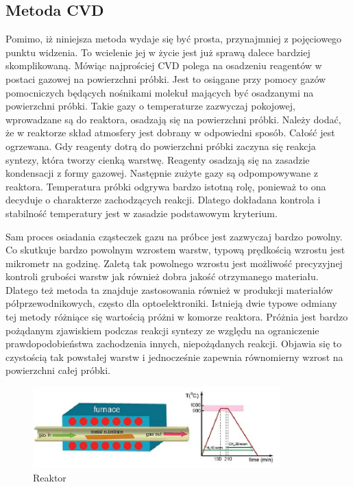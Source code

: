 	\subsection{Metoda CVD}
	
	Pomimo, iż niniejsza metoda wydaje się być prosta, przynajmniej z pojęciowego punktu widzenia. To wcielenie jej
	w życie jest już sprawą dalece bardziej skomplikowaną.
	Mówiąc najprościej CVD polega na osadzeniu reagentów w postaci gazowej na powierzchni próbki. Jest to osiągane
	przy pomocy gazów pomocniczych będących nośnikami molekuł mających być osadzanymi na powierzchni próbki.
	Takie gazy o temperaturze zazwyczaj pokojowej, wprowadzane są do reaktora, osadzają się na powierzchni próbki. 
	Należy dodać, że w reaktorze skład atmosfery jest dobrany w odpowiedni sposób. Całość jest ogrzewana.
	Gdy reagenty dotrą do powierzchni próbki zaczyna się reakcja syntezy, która tworzy cienką warstwę.
	Reagenty osadzają się na zasadzie kondensacji z formy gazowej.
	Następnie zużyte gazy są odpompowywane z reaktora. Temperatura próbki odgrywa bardzo istotną rolę, ponieważ
	to ona decyduje o charakterze zachodzących reakcji. Dlatego dokładana kontrola i stabilność temperatury jest
	w zasadzie podstawowym kryterium.
	
	Sam proces osiadania cząsteczek gazu na próbce jest zazwyczaj bardzo powolny. Co skutkuje bardzo powolnym 
	wzrostem warstw, typową prędkością wzrostu jest mikrometr na godzinę. Zaletą tak powolnego wzrostu jest 
	możliwość precyzyjnej kontroli grubości warstw jak również dobra jakość otrzymanego materiału. Dlatego też
	metoda ta znajduje zastosowania również w produkcji materiałów półprzewodnikowych, często dla optoelektroniki.
	Istnieją dwie typowe odmiany tej metody różniące się wartością próżni w komorze reaktora. Próżnia jest 
	bardzo pożądanym zjawiskiem podczas reakcji syntezy ze względu na ograniczenie prawdopodobieństwa zachodzenia
	innych, niepożądanych reakcji. Objawia się to czystością tak powstałej warstw i jednocześnie zapewnia równomierny
	wzrost na powierzchni całej próbki.

		\begin{figure}[ht]
	\centering
	\includegraphics[width=0.85\textwidth]{./Rozdzial_2/obrazki/Reaktor.png}
	\caption{Reaktor}
	\label{fig:reaktor}
	\end{figure}

